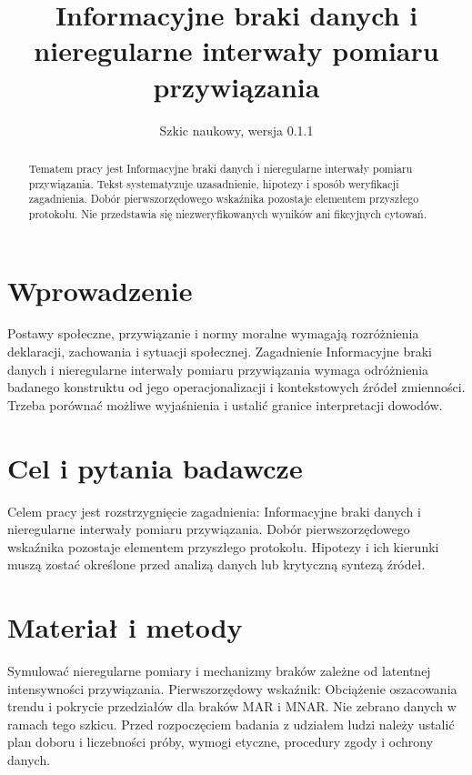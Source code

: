 \documentclass[11pt,a4paper]{article}
\title{Informacyjne braki danych i nieregularne interwały pomiaru przywiązania}
\author{}
\date{Szkic naukowy, wersja 0.1.1}
\begin{document}
\maketitle

\begin{abstract}

Tematem pracy jest Informacyjne braki danych i nieregularne interwały pomiaru przywiązania. Tekst systematyzuje uzasadnienie, hipotezy i sposób weryfikacji zagadnienia. Dobór pierwszorzędowego wskaźnika pozostaje elementem przyszłego protokołu. Nie przedstawia się niezweryfikowanych wyników ani fikcyjnych cytowań.

\end{abstract}

\section{Wprowadzenie}

Postawy społeczne, przywiązanie i normy moralne wymagają rozróżnienia deklaracji, zachowania i sytuacji społecznej. Zagadnienie Informacyjne braki danych i nieregularne interwały pomiaru przywiązania wymaga odróżnienia badanego konstruktu od jego operacjonalizacji i kontekstowych źródeł zmienności. Trzeba porównać możliwe wyjaśnienia i ustalić granice interpretacji dowodów.

\section{Cel i pytania badawcze}

Celem pracy jest rozstrzygnięcie zagadnienia: Informacyjne braki danych i nieregularne interwały pomiaru przywiązania. Dobór pierwszorzędowego wskaźnika pozostaje elementem przyszłego protokołu. Hipotezy i ich kierunki muszą zostać określone przed analizą danych lub krytyczną syntezą źródeł.

\section{Materiał i metody}

Symulować nieregularne pomiary i mechanizmy braków zależne od latentnej intensywności przywiązania. Pierwszorzędowy wskaźnik: Obciążenie oszacowania trendu i pokrycie przedziałów dla braków MAR i MNAR. Nie zebrano danych w ramach tego szkicu. Przed rozpoczęciem badania z udziałem ludzi należy ustalić plan doboru i liczebności próby, wymogi etyczne, procedury zgody i ochrony danych.
\end{document}
